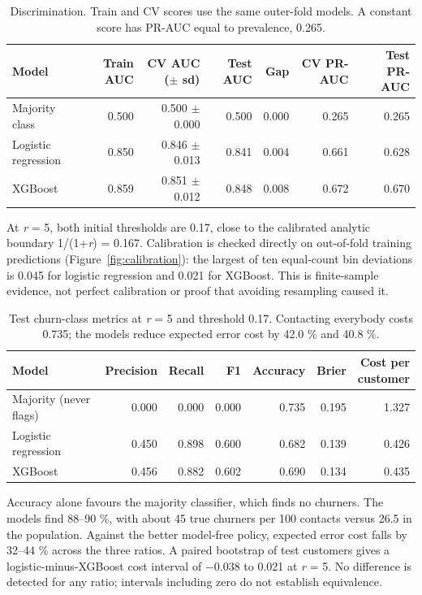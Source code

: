 \documentclass[10pt,a4paper]{article}
\begin{document}
\begin{table}[H]
\centering\small
\setlength{\tabcolsep}{4pt}
\begin{tabular*}{\linewidth}{@{\extracolsep{\fill}}lrrrrrr@{}}
\toprule
Model & Train AUC & CV AUC ($\pm$ sd) & Test AUC & Gap & CV PR-AUC & Test PR-AUC \\
\midrule
Majority class & 0.500 & 0.500 \ensuremath{\pm} 0.000 & 0.500 & 0.000 & 0.265 & 0.265 \\
Logistic regression & 0.850 & 0.846 \ensuremath{\pm} 0.013 & 0.841 & 0.004 & 0.661 & 0.628 \\
XGBoost & 0.859 & 0.851 \ensuremath{\pm} 0.012 & 0.848 & 0.008 & 0.672 & 0.670 \\
\bottomrule
\end{tabular*}
\caption{Discrimination. Train and CV scores use the
same outer-fold models. A constant score has PR-AUC equal to prevalence,
0.265.}
\label{tab:discrimination}
\end{table}

At \emph{r} = 5, both initial thresholds are 0.17, close to the
calibrated analytic boundary 1/(1+\emph{r}) = 0.167. Calibration is
checked directly on out-of-fold training predictions (Figure~\ref{fig:calibration}): the
largest of ten equal-count bin deviations is 0.045 for logistic
regression and 0.021 for XGBoost. This is finite-sample evidence, not
perfect calibration or proof that avoiding resampling caused it.

\begin{table}[H]
\centering\small
\setlength{\tabcolsep}{4pt}
\begin{tabular*}{\linewidth}{@{\extracolsep{\fill}}lrrrrrr@{}}
\toprule
Model & Precision & Recall & F1 & Accuracy & Brier & \shortstack[r]{Cost per\\customer} \\
\midrule
Majority (never flags) & 0.000 & 0.000 & 0.000 & 0.735 & 0.195 & 1.327 \\
Logistic regression & 0.450 & 0.898 & 0.600 & 0.682 & 0.139 & 0.426 \\
XGBoost & 0.456 & 0.882 & 0.602 & 0.690 & 0.134 & 0.435 \\
\bottomrule
\end{tabular*}
\caption{Test churn-class metrics at \emph{r} = 5 and
threshold 0.17. Contacting everybody costs 0.735; the models reduce
expected error cost by 42.0 \% and 40.8 \%.}
\label{tab:cost}
\end{table}

Accuracy alone favours the majority classifier, which finds no churners.
The models find 88--90 \%, with about 45 true churners per 100 contacts
versus 26.5 in the population. Against the better model-free policy,
expected error cost falls by 32--44 \% across the three ratios. A paired
bootstrap of test customers gives a logistic-minus-XGBoost cost interval
of \ensuremath{-}0.038 to 0.021 at \emph{r} = 5. No difference is detected for any
ratio; intervals including zero do not establish equivalence.
\end{document}
